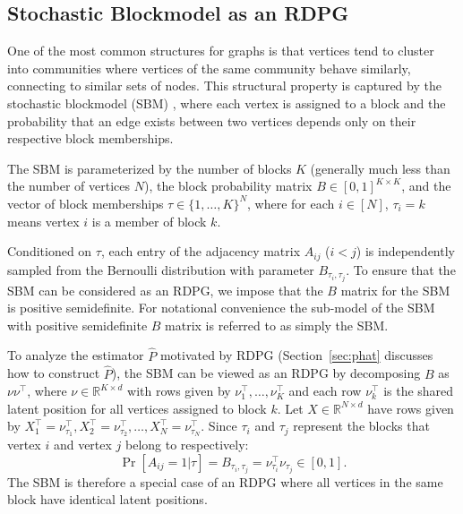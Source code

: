 \documentclass[journal,twoside,web]{ieeecolor}
\renewcommand{\Re}{\mathbb{R}}
\begin{document}
\subsection{Stochastic Blockmodel as an RDPG}
\label{section:sbm_rdpg}
One of the most common structures for graphs is that vertices tend to cluster into communities where vertices of the same community behave similarly, connecting to similar sets of nodes.
This structural property is captured by the stochastic blockmodel (SBM) \cite{holland1983stochastic}, where each vertex is assigned to a block and the probability that an edge exists between two vertices depends only on their respective block memberships.



The SBM is parameterized by the number of blocks $K$ (generally much less than the number of vertices $N$), the block probability matrix $B \in [0,1]^{K \times K}$, and the vector of block memberships
$\tau\in\{1,\dotsc,K\}^N$, where for each $i \in [N]$, $\tau_i = k$ means vertex $i$ is a member of block $k$.

Conditioned on $\tau$, each entry of the adjacency matrix $A_{ij}$ ($i < j$) is independently sampled from the Bernoulli distribution with parameter $B_{\tau_i,\tau_j}$.
To ensure that the SBM can be considered as an RDPG, we impose that the $B$ matrix for the SBM is positive semidefinite.
For notational convenience the sub-model of the SBM with positive semidefinite $B$ matrix is referred to  as simply the SBM.

To analyze the estimator $\hat{P}$ motivated by RDPG (Section~\ref{sec:phat} discusses how to construct $\hat{P}$), the SBM can be viewed as an RDPG by
decomposing $B$ as $\nu \nu^{\top}$, where $\nu \in \Re^{K \times d}$ with rows given by $\nu_1^{\top}, \dotsc, \nu_K^{\top}$ and each row $\nu_k^{\top}$ is the shared latent position for all vertices assigned to block $k$.
Let $X \in \Re^{N \times d}$ have rows given by $X_1^{\top} = \nu_{\tau_1}^{\top}, X_2^{\top} = \nu_{\tau_2}^{\top}, \dotsc, X_N^{\top} = \nu_{\tau_N}^{\top}$.
Since $\tau_i$ and $\tau_j$ represent the blocks that vertex $i$ and vertex $j$ belong to respectively:
\[
    \Pr[A_{ij} = 1|\tau] = B_{\tau_i, \tau_j} = \nu_{\tau_i}^{\top} \nu_{\tau_j}^{\phantom{\top}} \in [0, 1].
\]
The SBM is therefore a special case of  an RDPG where all vertices in the same block have identical latent positions.
\end{document}
